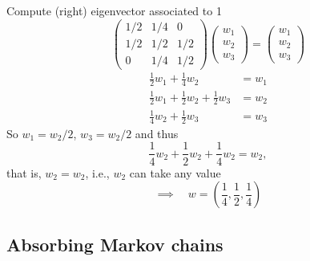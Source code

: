 \documentclass[aspectratio=169]{beamer}
\begin{document}
\begin{frame}
Compute (right) eigenvector associated to 1
\[
\begin{pmatrix}
	1/2 & 1/4 & 0 \\
	1/2 & 1/2 & 1/2 \\
	0 & 1/4 & 1/2
\end{pmatrix}
\begin{pmatrix}
	w_1\\w_2\\w_3
\end{pmatrix}
=
\begin{pmatrix}
	w_1\\w_2\\w_3
\end{pmatrix}
\]
\begin{align*}
\frac 12 w_1+\frac 14 w_2 &= w_1 \\
\frac 12 w_1+\frac 12 w_2+\frac 12 w_3 &= w_2 \\
\frac 14 w_2+\frac 12 w_3 &= w_3
\end{align*}
So $w_1=w_2/2$, $w_3=w_2/2$ and thus
\[
\frac 14 w_2+\frac 12 w_2 +\frac 14 w_2=w_2,
\]
that is, $w_2=w_2$, i.e., $w_2$ can take any value
\vfill
\[
\implies\quad w=\left(\dfrac 14,\dfrac 12,\dfrac 14\right)
\]
\end{frame}



\subsection{Absorbing Markov chains}
\end{document}
